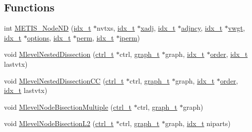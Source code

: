 \subsection*{Functions}
\begin{DoxyCompactItemize}
\item 
int \hyperlink{a00933_a8304f0dd6d180587f73b0b70de3b01b7}{M\+E\+T\+I\+S\+\_\+\+Node\+ND} (\hyperlink{a00876_aaa5262be3e700770163401acb0150f52}{idx\+\_\+t} $\ast$nvtxs, \hyperlink{a00876_aaa5262be3e700770163401acb0150f52}{idx\+\_\+t} $\ast$\hyperlink{a00879_aa8fc7f75458e38e1e2979ed6db639164}{xadj}, \hyperlink{a00876_aaa5262be3e700770163401acb0150f52}{idx\+\_\+t} $\ast$\hyperlink{a00879_a20c068e3ebdd8f9889fb82c1f677d679}{adjncy}, \hyperlink{a00876_aaa5262be3e700770163401acb0150f52}{idx\+\_\+t} $\ast$\hyperlink{a00879_a34203f1160d94eca83e95f2718ea3504}{vwgt}, \hyperlink{a00876_aaa5262be3e700770163401acb0150f52}{idx\+\_\+t} $\ast$\hyperlink{a00879_a68c032ed4161802775c6847d4cb39adf}{options}, \hyperlink{a00876_aaa5262be3e700770163401acb0150f52}{idx\+\_\+t} $\ast$\hyperlink{a00879_ab96e9eb84fc7c342d17690a1341645dd}{perm}, \hyperlink{a00876_aaa5262be3e700770163401acb0150f52}{idx\+\_\+t} $\ast$\hyperlink{a00879_a76ba0ee1ced7914ce87ac7eab1758c42}{iperm})
\item 
void \hyperlink{a00933_af853e9d8bbb2188f871fac436e631ed1}{Mlevel\+Nested\+Dissection} (\hyperlink{a00742}{ctrl\+\_\+t} $\ast$ctrl, \hyperlink{a00734}{graph\+\_\+t} $\ast$graph, \hyperlink{a00876_aaa5262be3e700770163401acb0150f52}{idx\+\_\+t} $\ast$\hyperlink{a00611_aab21ede0c02820806e77fd7890ee6bd7}{order}, \hyperlink{a00876_aaa5262be3e700770163401acb0150f52}{idx\+\_\+t} lastvtx)
\item 
void \hyperlink{a00933_a3ef15d1ffff55a81b8486bee09239073}{Mlevel\+Nested\+Dissection\+CC} (\hyperlink{a00742}{ctrl\+\_\+t} $\ast$ctrl, \hyperlink{a00734}{graph\+\_\+t} $\ast$graph, \hyperlink{a00876_aaa5262be3e700770163401acb0150f52}{idx\+\_\+t} $\ast$\hyperlink{a00611_aab21ede0c02820806e77fd7890ee6bd7}{order}, \hyperlink{a00876_aaa5262be3e700770163401acb0150f52}{idx\+\_\+t} lastvtx)
\item 
void \hyperlink{a00933_a59c8030c5429e219a8535c2a11cef724}{Mlevel\+Node\+Bisection\+Multiple} (\hyperlink{a00742}{ctrl\+\_\+t} $\ast$ctrl, \hyperlink{a00734}{graph\+\_\+t} $\ast$graph)
\item 
void \hyperlink{a00933_ac3a0eaeefa34a3865a0be5bb70bd958f}{Mlevel\+Node\+Bisection\+L2} (\hyperlink{a00742}{ctrl\+\_\+t} $\ast$ctrl, \hyperlink{a00734}{graph\+\_\+t} $\ast$graph, \hyperlink{a00876_aaa5262be3e700770163401acb0150f52}{idx\+\_\+t} niparts)

\end{DoxyCompactItemize}
